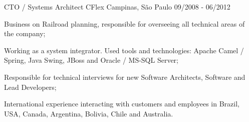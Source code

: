 \begin{cventries}
\cventry
{CTO / Systems Architect}
{CFlex}
{Campinas, São Paulo}
{09/2008 - 06/2012}
{
\begin{cvitems}
\item Business on Railroad planning, responsible for overseeing all technical areas of the company;
\item Working as a system integrator. Used tools and technologies: Apache Camel / Spring, Java Swing, JBoss and Oracle / MS-SQL Server;
\item Responsible for technical interviews for new Software Architects, Software and Lead Developers;
\item International experience interacting with customers and employees in Brazil, USA, Canada, Argentina, Bolivia, Chile and Australia.
\end{cvitems}
}
\end{cventries}


